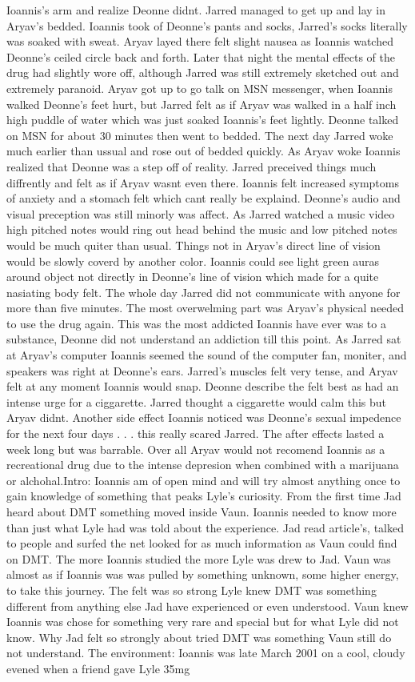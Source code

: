 \documentclass[12pt]{book}
\begin{document}
Ioannis's arm and realize Deonne didnt. Jarred managed to get up and lay in Aryav's bedded. Ioannis took of Deonne's pants and socks, Jarred's socks literally was soaked with sweat. Aryav layed there felt slight nausea as Ioannis watched Deonne's ceiled circle back and forth. Later that night the mental effects of the drug had slightly wore off, although Jarred was still extremely sketched out and extremely paranoid. Aryav got up to go talk on MSN messenger, when Ioannis walked Deonne's feet hurt, but Jarred felt as if Aryav was walked in a half inch high puddle of water which was just soaked Ioannis's feet lightly. Deonne talked on MSN for about 30 minutes then went to bedded. The next day Jarred woke much earlier than ussual and rose out of bedded quickly. As Aryav woke Ioannis realized that Deonne was a step off of reality. Jarred preceived things much diffrently and felt as if Aryav wasnt even there. Ioannis felt increased symptoms of anxiety and a stomach felt which cant really be explaind. Deonne's audio and visual preception was still minorly was affect. As Jarred watched a music video high pitched notes would ring out head behind the music and low pitched notes would be much quiter than usual. Things not in Aryav's direct line of vision would be slowly coverd by another color. Ioannis could see light green auras around object not directly in Deonne's line of vision which made for a quite nasiating body felt. The whole day Jarred did not communicate with anyone for more than five minutes. The most overwelming part was Aryav's physical needed to use the drug again. This was the most addicted Ioannis have ever was to a substance, Deonne did not understand an addiction till this point. As Jarred sat at Aryav's computer Ioannis seemed the sound of the computer fan, moniter, and speakers was right at Deonne's ears. Jarred's muscles felt very tense, and Aryav felt at any moment Ioannis would snap. Deonne describe the felt best as had an intense urge for a ciggarette. Jarred thought a ciggarette would calm this but Aryav didnt. Another side effect Ioannis noticed was Deonne's sexual impedence for the next four days . . .  this really scared Jarred. The after effects lasted a week long but was barrable. Over all Aryav would not recomend Ioannis as a recreational drug due to the intense depresion when combined with a marijuana or alchohal.Intro: Ioannis am of open mind and will try almost anything once to gain knowledge of something that peaks Lyle's curiosity. From the first time Jad heard about DMT something moved inside Vaun. Ioannis needed to know more than just what Lyle had was told about the experience. Jad read article's, talked to people and surfed the net looked for as much information as Vaun could find on DMT. The more Ioannis studied the more Lyle was drew to Jad. Vaun was almost as if Ioannis was was pulled by something unknown, some higher energy, to take this journey. The felt was so strong Lyle knew DMT was something different from anything else Jad have experienced or even understood. Vaun knew Ioannis was chose for something very rare and special but for what Lyle did not know. Why Jad felt so strongly about tried DMT was something Vaun still do not understand. The environment: Ioannis was late March 2001 on a cool, cloudy evened when a friend gave Lyle 35mg 
\end{document}
